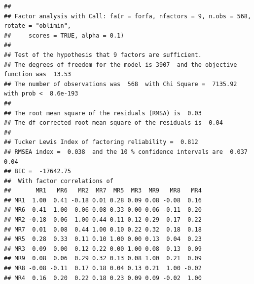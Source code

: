\documentclass[
  english,
  man]{apa6}
\begin{document}
\begin{verbatim}
## 
## Factor analysis with Call: fa(r = forfa, nfactors = 9, n.obs = 568, rotate = "oblimin", 
##     scores = TRUE, alpha = 0.1)
## 
## Test of the hypothesis that 9 factors are sufficient.
## The degrees of freedom for the model is 3907  and the objective function was  13.53 
## The number of observations was  568  with Chi Square =  7135.92  with prob <  8.6e-193 
## 
## The root mean square of the residuals (RMSA) is  0.03 
## The df corrected root mean square of the residuals is  0.04 
## 
## Tucker Lewis Index of factoring reliability =  0.812
## RMSEA index =  0.038  and the 10 % confidence intervals are  0.037 0.04
## BIC =  -17642.75
##  With factor correlations of 
##       MR1   MR6   MR2  MR7  MR5  MR3  MR9   MR8   MR4
## MR1  1.00  0.41 -0.18 0.01 0.28 0.09 0.08 -0.08  0.16
## MR6  0.41  1.00  0.06 0.08 0.33 0.00 0.06 -0.11  0.20
## MR2 -0.18  0.06  1.00 0.44 0.11 0.12 0.29  0.17  0.22
## MR7  0.01  0.08  0.44 1.00 0.10 0.22 0.32  0.18  0.18
## MR5  0.28  0.33  0.11 0.10 1.00 0.00 0.13  0.04  0.23
## MR3  0.09  0.00  0.12 0.22 0.00 1.00 0.08  0.13  0.09
## MR9  0.08  0.06  0.29 0.32 0.13 0.08 1.00  0.21  0.09
## MR8 -0.08 -0.11  0.17 0.18 0.04 0.13 0.21  1.00 -0.02
## MR4  0.16  0.20  0.22 0.18 0.23 0.09 0.09 -0.02  1.00
\end{verbatim}
\end{document}
